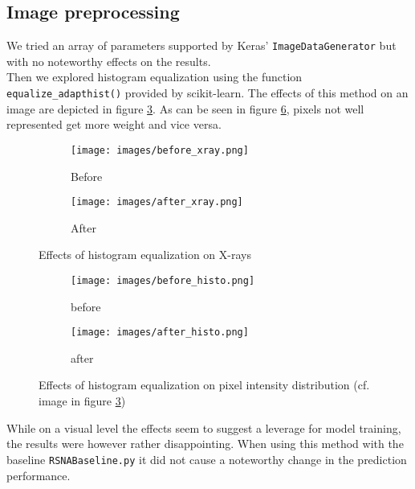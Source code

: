 \documentclass[10pt,twocolumn,letterpaper]{article}
\begin{document}
\subsection{Image preprocessing}
We tried an array of parameters supported by Keras' \verb+ImageDataGenerator+ but with no noteworthy effects on the results.\\
Then we explored histogram equalization using the function \verb+equalize_adapthist()+ provided by scikit-learn. The effects of this method on an image are depicted in figure \ref{fig:fighistx}. As can be seen in figure \ref{fig:fighistd}, pixels not well represented get more weight and vice versa.

\begin{figure}[h]
\centering
\begin{subfigure}{0.2\textwidth}
\texttt{[image: images/before\_xray.png]} 
\caption{Before}
\label{fig:subim1}
\end{subfigure}
\begin{subfigure}{0.2\textwidth}
\texttt{[image: images/after\_xray.png]}
\caption{After}
\label{fig:subim2}
\end{subfigure}
\caption{Effects of histogram equalization on X-rays}
\label{fig:fighistx}
\end{figure}

\begin{figure}[h]
\centering
\begin{subfigure}{0.2\textwidth}
\texttt{[image: images/before\_histo.png]} 
\caption{before}
\label{fig:subim1}
\end{subfigure}
\begin{subfigure}{0.2\textwidth}
\texttt{[image: images/after\_histo.png]}
\caption{after}
\label{fig:subim2}
\end{subfigure}
\caption{Effects of histogram equalization on pixel intensity distribution (cf. image in figure \ref{fig:fighistx})}
\label{fig:fighistd}
\end{figure}

While on a visual level the effects seem to suggest a leverage for model training, the results were however rather disappointing. When using this method with the baseline \verb+RSNABaseline.py+ it did not cause a noteworthy change in the prediction performance.
\end{document}
